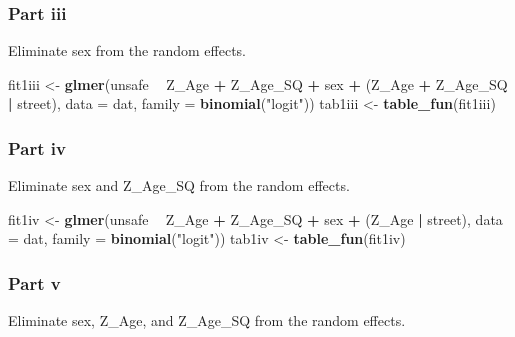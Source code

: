 \documentclass[]{article}
\newenvironment{Shaded}{\begin{snugshade}}{\end{snugshade}}
\newcommand{\KeywordTok}[1]{\textcolor[rgb]{0.13,0.29,0.53}{\textbf{#1}}}
\newcommand{\DataTypeTok}[1]{\textcolor[rgb]{0.13,0.29,0.53}{#1}}
\newcommand{\StringTok}[1]{\textcolor[rgb]{0.31,0.60,0.02}{#1}}
\newcommand{\OperatorTok}[1]{\textcolor[rgb]{0.81,0.36,0.00}{\textbf{#1}}}
\newcommand{\NormalTok}[1]{#1}
\begin{document}
\subsubsection{Part iii}\label{part-iii}

Eliminate sex from the random effects.

\begin{Shaded}
\begin{Highlighting}[]
\NormalTok{fit1iii <-}\StringTok{ }\KeywordTok{glmer}\NormalTok{(unsafe }\OperatorTok{~}\StringTok{ }\NormalTok{Z_Age }\OperatorTok{+}\StringTok{ }\NormalTok{Z_Age_SQ }\OperatorTok{+}\StringTok{ }\NormalTok{sex }\OperatorTok{+}\StringTok{ }\NormalTok{(Z_Age }\OperatorTok{+}\StringTok{ }\NormalTok{Z_Age_SQ }\OperatorTok{|}\StringTok{ }\NormalTok{street), }
                 \DataTypeTok{data =}\NormalTok{ dat, }\DataTypeTok{family =} \KeywordTok{binomial}\NormalTok{(}\StringTok{"logit"}\NormalTok{))}
\NormalTok{tab1iii <-}\StringTok{ }\KeywordTok{table_fun}\NormalTok{(fit1iii)}
\end{Highlighting}
\end{Shaded}

\subsubsection{Part iv}\label{part-iv}

Eliminate sex and Z\_Age\_SQ from the random effects.

\begin{Shaded}
\begin{Highlighting}[]
\NormalTok{fit1iv <-}\StringTok{ }\KeywordTok{glmer}\NormalTok{(unsafe }\OperatorTok{~}\StringTok{ }\NormalTok{Z_Age }\OperatorTok{+}\StringTok{ }\NormalTok{Z_Age_SQ }\OperatorTok{+}\StringTok{ }\NormalTok{sex }\OperatorTok{+}\StringTok{ }\NormalTok{(Z_Age }\OperatorTok{|}\StringTok{ }\NormalTok{street), }
                \DataTypeTok{data =}\NormalTok{ dat, }\DataTypeTok{family =} \KeywordTok{binomial}\NormalTok{(}\StringTok{"logit"}\NormalTok{))}
\NormalTok{tab1iv <-}\StringTok{ }\KeywordTok{table_fun}\NormalTok{(fit1iv)}
\end{Highlighting}
\end{Shaded}

\subsubsection{Part v}\label{part-v}

Eliminate sex, Z\_Age, and Z\_Age\_SQ from the random effects.
\end{document}
